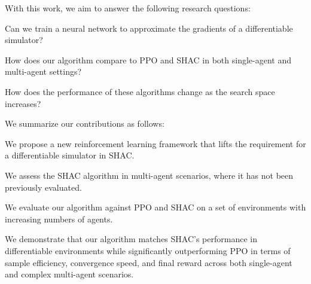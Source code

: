 With this work, we aim to answer the following research questions:
\begin{compactitem}
    \item {} Can we train a neural network to approximate the gradients of a differentiable simulator?
    \item {} How does our algorithm compare to PPO and SHAC in both single-agent and multi-agent settings?
    \item {} How does the performance of these algorithms change as the search space increases?
\end{compactitem}

We summarize our contributions as follows:
\begin{compactitem}
    \item We propose a new reinforcement learning framework that lifts the requirement for a differentiable simulator in SHAC\@.
    \item We assess the SHAC algorithm in multi-agent scenarios, where it has not been previously evaluated.
    \item We evaluate our algorithm against PPO and SHAC on a set of environments with increasing numbers of agents.
    \item We demonstrate that our algorithm matches SHAC's performance in differentiable environments while significantly outperforming PPO in terms of sample efficiency, convergence speed, and final reward across both single-agent and complex multi-agent scenarios.
\end{compactitem}
